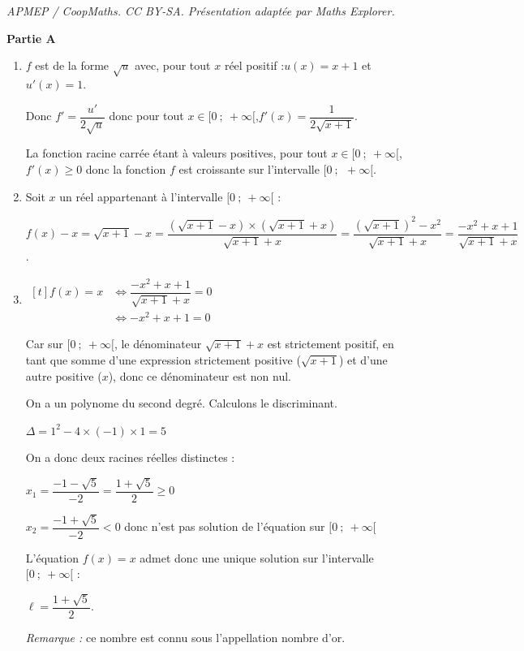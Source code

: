 \documentclass[10pt]{article}
\begin{document}
\noindent\textit{APMEP / CoopMaths. CC BY-SA. Présentation adaptée par Maths Explorer.}\par\medskip
\medskip
\textbf{Partie A}

\begin{enumerate}
	\item  $f$ est de la forme $\sqrt{u}$ avec, pour tout $x$ réel positif :\quad  $u(x)= x+1$ \quad et \quad $u'(x)=1$.

	Donc \quad $f'= \dfrac{u'}{2\sqrt{u}}$ \quad donc pour tout $x \in [0~;~+\infty[$,\quad  $f'(x) =   \dfrac{1}{2\sqrt{x+1}}$.

	La fonction racine carrée étant à valeurs positives, pour tout $x \in [0~;~+\infty[$, $f'(x) \geqslant 0$  donc la fonction $f$ est croissante  sur l'intervalle $[0~;~~+\infty[$.

	\item Soit $x$ un réel appartenant à l'intervalle $[0~;~+\infty[$ :

	$f(x) - x =  \sqrt{x+1} -x =    \dfrac {   \left(  \sqrt{x+1} -x    \right) \times   \left(  \sqrt{x+1} +x    \right)  }    {  \sqrt{x+1} +x    }    =      \dfrac {   \left(  \sqrt{x+1}    \right) ^2- x^2  } {   \sqrt{x+1} +x     }     =      \dfrac{-x^2 + x + 1}{\sqrt{x + 1} + x}$.


	\item  $\begin{aligned}[t] f(x) = x &\iff  \dfrac{-x^2 + x + 1}{\sqrt{x + 1} + x} = 0  \\
	&\iff -x^2+x+1=0\end{aligned}$

	Car sur $[0~;~+\infty[$, le dénominateur $\sqrt{x+1} + x$ est strictement positif, en tant que somme d'une expression strictement positive ($\sqrt{x+1}$) et d'une autre positive ($x$), donc ce dénominateur est non nul.

	On a un polynome du second degré. Calculons le discriminant.

	$\Delta = 1^2-4 \times (-1) \times 1= 5$

	On a donc deux racines réelles distinctes :

	$x_1 = \dfrac{-1-\sqrt{5}}{-2}= \dfrac{1 +\sqrt 5}{2}\geqslant 0$


	$x_2= \dfrac{-1+\sqrt{5}}{-2}<0$ \quad donc n'est pas solution de l'équation sur $[0~;~+\infty[$


	L'équation $f(x)=x$ admet donc une unique solution  sur l'intervalle $[0~;~+\infty[$ :

	$\ell = \dfrac{1 +\sqrt 5}{2}$.

	\emph{Remarque :} ce nombre est connu sous l'appellation \og nombre d'or\fg{}.

\end{enumerate}
\end{document}
